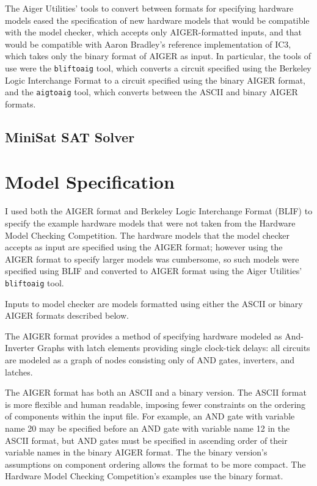 \documentclass[12pt,a4paper,twoside,openright]{report}
\begin{document}
The Aiger Utilities' tools to convert between formats for specifying
hardware models eased the specification of new hardware models that would
be compatible with the model checker, which accepts only AIGER-formatted inputs,
and that would be compatible with  Aaron Bradley's reference implementation of IC3,
which takes only the binary format of AIGER as input.
In particular, the tools of use were
the {\tt bliftoaig}
tool, which converts a circuit specified using the Berkeley Logic Interchange Format
to a circuit specified using the binary AIGER format, and the {\tt aigtoaig} tool,
which converts between the ASCII and binary AIGER formats.

\subsection{MiniSat SAT Solver}


\section{Model Specification}


I used both the AIGER format and Berkeley Logic Interchange Format (BLIF)
to specify the example hardware models that were not taken from the
Hardware Model Checking Competition.
The hardware models that the model checker accepts as input
are specified using the AIGER format;
however using the AIGER format to specify larger models was cumbersome,
so such models were specified using BLIF and converted to AIGER format
using the Aiger Utilities' \verb,bliftoaig, tool.

Inputs to model checker are models formatted using either the ASCII or
binary AIGER formats described below.

The AIGER format provides a method of specifying hardware modeled as
And-Inverter Graphs with latch elements providing single clock-tick
delays: all circuits are modeled as a graph of nodes consisting only of
AND gates, inverters, and latches.

The AIGER format has both an ASCII and a binary version. The ASCII
format is more flexible and human readable, imposing fewer constraints
on the ordering of components within the input file. For example, an
AND gate with variable name 20 may be specified before an AND gate with
variable name 12 in the ASCII format, but AND gates must be specified in
ascending order of their variable names in the binary AIGER format.
The the binary version's assumptions on component ordering allows the format
to be more compact. The Hardware Model Checking Competition's examples
use the binary format.
\end{document}
